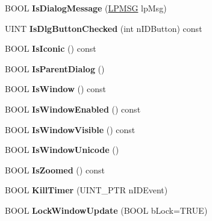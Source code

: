 \begin{DoxyCompactItemize}
B\+O\+OL {\bfseries Is\+Dialog\+Message} (\hyperlink{structtag_m_s_g}{L\+P\+M\+SG} lp\+Msg)
\item 
\mbox{\label{class_a_t_l_1_1_c_window_a0c4c2237947b37b022f39256c205c828}} 
U\+I\+NT {\bfseries Is\+Dlg\+Button\+Checked} (int n\+I\+D\+Button) const
\item 
\mbox{\label{class_a_t_l_1_1_c_window_a0a5892d8f4a9da763a11a14505a18795}} 
B\+O\+OL {\bfseries Is\+Iconic} () const
\item 
\mbox{\label{class_a_t_l_1_1_c_window_aeb00d178ee87dc3ca78494f661f8348e}} 
B\+O\+OL {\bfseries Is\+Parent\+Dialog} ()
\item 
\mbox{\label{class_a_t_l_1_1_c_window_ac2dc6f0e5848da86117b3ec2f8f52d93}} 
B\+O\+OL {\bfseries Is\+Window} () const
\item 
\mbox{\label{class_a_t_l_1_1_c_window_ae0e922b24c256134a75dd2e9faca2804}} 
B\+O\+OL {\bfseries Is\+Window\+Enabled} () const
\item 
\mbox{\label{class_a_t_l_1_1_c_window_a9f2c28bcd74dc4eb7b329e7e6f51fd86}} 
B\+O\+OL {\bfseries Is\+Window\+Visible} () const
\item 
\mbox{\label{class_a_t_l_1_1_c_window_ab1f5a20ce7c3f74bfd0eee776aa9531d}} 
B\+O\+OL {\bfseries Is\+Window\+Unicode} ()
\item 
\mbox{\label{class_a_t_l_1_1_c_window_a8293921ec3a9fa17a2a6aa29b9fe47f8}} 
B\+O\+OL {\bfseries Is\+Zoomed} () const
\item 
\mbox{\label{class_a_t_l_1_1_c_window_a9a676d66c0e1f7f702c86dc01561591c}} 
B\+O\+OL {\bfseries Kill\+Timer} (U\+I\+N\+T\+\_\+\+P\+TR n\+I\+D\+Event)
\item 
\mbox{\label{class_a_t_l_1_1_c_window_a0b95e663933f7b1835998e1c62c3b90a}} 
B\+O\+OL {\bfseries Lock\+Window\+Update} (B\+O\+OL b\+Lock=T\+R\+UE)
\item 

\end{DoxyCompactItemize}
